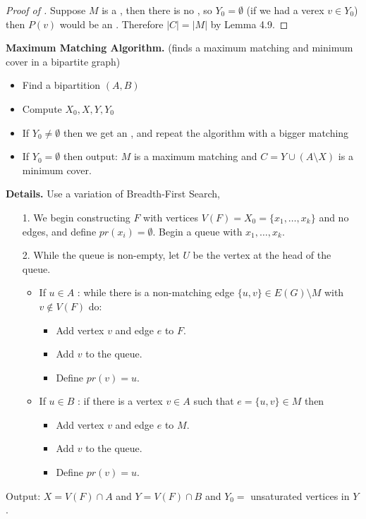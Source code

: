 \documentclass[english, 11pt]{article}
\begin{document}
 \begin{proof}[Proof of ]
   Suppose $M$ is a  , then there is no , so $Y_0 = \emptyset$ (if we had a verex $v \in Y_0$) then $P(v)$ would be an . Therefore $|C| = |M|$ by Lemma 4.9.
 \end{proof}

 \textbf{Maximum Matching Algorithm.} (finds a maximum matching and minimum cover in a bipartite graph)
 \begin{itemize}
   \item Find a bipartition $(A,B)$
   \item Compute $X_0, X, Y, Y_0$
   \item If $Y_0 \not = \emptyset$ then we get an , and repeat the algorithm with a bigger matching
   \item If $Y_0 = \emptyset$ then output: $M$ is a maximum matching and $C = Y \cup (A \setminus X)$ is a minimum cover.
 \end{itemize}

 \textbf{Details.} Use a variation of Breadth-First Search,
 \begin{itemize}
   \item[1.] We begin constructing $F$ with vertices $V(F) = X_0 = \{x_1, \ldots, x_k\}$ and no edges, and define $pr(x_i) =\emptyset$. Begin a queue with $x_1, \ldots, x_k$.
   \item[2.] While the queue is non-empty, let $U$ be the vertex at the head of the queue.
   \begin{itemize}
     \item If $u \in A$ : while there is a non-matching edge $\{u,v\} \in E(G) \setminus M$ with $v \not \in V(F)
     $ do:
     \begin{itemize}
       \item Add vertex $v$ and edge $e$ to $F$.
       \item Add $v$ to the queue.
       \item Define $pr(v) = u$.
     \end{itemize}
     \item If $u \in B$ : if there is a vertex $v \in A$ such that $e =\{u,v\} \in M$ then
     \begin{itemize}
       \item Add vertex $v$ and edge $e$ to $M$.
       \item Add $v$ to the queue.
       \item Define $pr(v) = u$.
     \end{itemize}
   \end{itemize}
 \end{itemize}
 Output: $X = V(F) \cap A$ and $Y = V(F) \cap B$ and $Y_0 = $ unsaturated vertices in $Y$. \\
\end{document}
